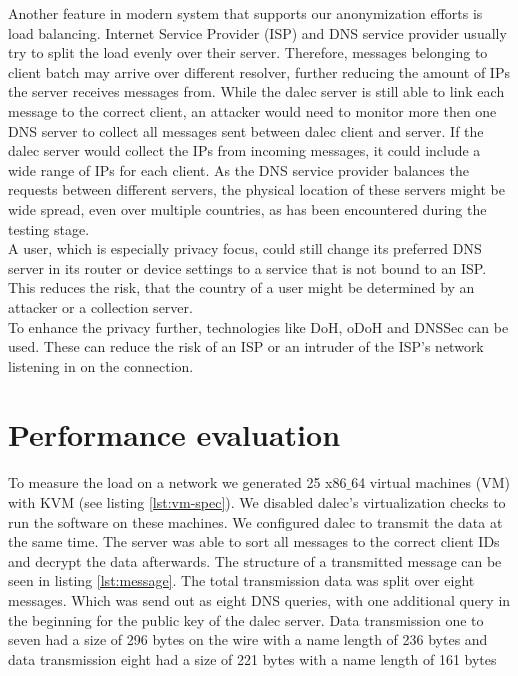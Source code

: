     Another feature in modern system that supports our anonymization efforts is load balancing. Internet Service Provider (ISP) and DNS service provider usually try to split the load evenly over their server. Therefore, messages belonging to client batch may arrive over different resolver, further reducing the amount of IPs the server receives messages from. While the dalec server is still able to link each message to the correct client, an attacker would need to monitor more then one DNS server to collect all messages sent between dalec client and server. If the dalec server would collect the IPs from incoming messages, it could include a wide range of IPs for each client. As the DNS service provider balances the requests between different servers, the physical location of these servers might be wide spread, even over multiple countries, as has been encountered during the testing stage.\\
    
    A user, which is especially privacy focus, could still change its preferred DNS server in its router or device settings to a service that is not bound to an ISP. This reduces the risk, that the country of a user might be determined by an attacker or a collection server.\\
    To enhance the privacy further, technologies like DoH, oDoH and DNSSec can be used. These can reduce the risk of an ISP or an intruder of the ISP's network listening in on the connection. 




\section{Performance evaluation}
\label{sec:results:telemetry}
%
    
    To measure the load on a network we generated 25 x86$\_$64 virtual machines (VM) with KVM (see listing \ref{lst:vm-spec}). We disabled dalec's virtualization checks to run the software on these machines. We configured dalec to transmit the data at the same time. The server was able to sort all messages to the correct client IDs and decrypt the data afterwards. The structure of a transmitted message can be seen in listing \ref{lst:message}. The total transmission data was split over eight messages.
    Which was send out as eight DNS queries, with one additional query in the beginning for the public key of the dalec server.
    Data transmission one to seven had a size of 296 bytes on the wire with a name length of 236 bytes and data transmission eight had a size of 221 bytes with a name length of 161 bytes
    
